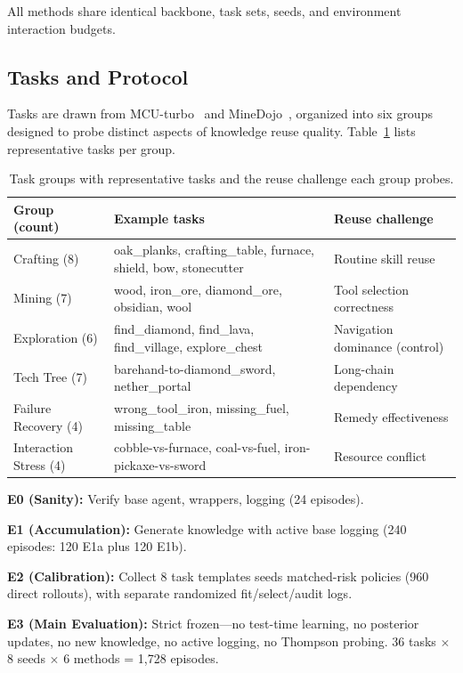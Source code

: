 \documentclass[letterpaper]{article}
\begin{document}
All methods share identical backbone, task sets, seeds, and environment interaction budgets.

\subsection{Tasks and Protocol}

Tasks are drawn from MCU-turbo~\cite{mcu2024} and MineDojo~\cite{minedojo2022}, organized into six groups designed to probe distinct aspects of knowledge reuse quality. Table~\ref{tab:tasks} lists representative tasks per group.

\begin{table}[t]
\centering
\caption{Task groups with representative tasks and the reuse challenge each group probes.}
\label{tab:tasks}
\small
\begin{tabular}{p{2.7cm}p{3.3cm}p{2.0cm}}
\toprule
\textbf{Group (count)} & \textbf{Example tasks} & \textbf{Reuse challenge} \\
\midrule
Crafting (8) & oak\_planks, crafting\_table, furnace, shield, bow, stonecutter & Routine skill reuse \\
Mining (7) & wood, iron\_ore, diamond\_ore, obsidian, wool & Tool selection correctness \\
Exploration (6) & find\_diamond, find\_lava, find\_village, explore\_chest & Navigation dominance (control) \\
Tech Tree (7) & barehand-to-diamond\_sword, nether\_portal & Long-chain dependency \\
Failure Recovery (4) & wrong\_tool\_iron, missing\_fuel, missing\_table & Remedy effectiveness \\
Interaction Stress (4) & cobble-vs-furnace, coal-vs-fuel, iron-pickaxe-vs-sword & Resource conflict \\
\bottomrule
\end{tabular}
\end{table}

\textbf{E0 (Sanity):} Verify base agent, wrappers, logging (24 episodes).

\textbf{E1 (Accumulation):} Generate knowledge with active base logging (240 episodes: 120 E1a plus 120 E1b).

\textbf{E2 (Calibration):} Collect 8 task templates  seeds  matched-risk policies (960 direct rollouts), with separate randomized fit/select/audit logs.

\textbf{E3 (Main Evaluation):} Strict frozen---no test-time learning, no posterior updates, no new knowledge, no active logging, no Thompson probing. 36 tasks $\times$ 8 seeds $\times$ 6 methods = 1,728 episodes.
\end{document}
